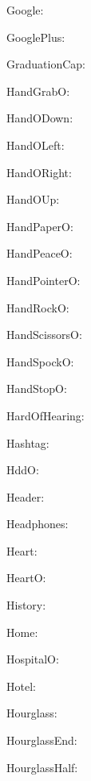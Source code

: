 \documentclass{article}
\begin{document}
      Google: \faGoogle\ 

      GooglePlus: \faGooglePlus\ 

      GraduationCap: \faGraduationCap\ 

      HandGrabO: \faHandGrabO\ 

      HandODown: \faHandODown\ 

      HandOLeft: \faHandOLeft\ 

      HandORight: \faHandORight\ 

      HandOUp: \faHandOUp\ 

      HandPaperO: \faHandPaperO\ 

      HandPeaceO: \faHandPeaceO\ 

      HandPointerO: \faHandPointerO\ 

      HandRockO: \faHandRockO\ 

      HandScissorsO: \faHandScissorsO\ 

      HandSpockO: \faHandSpockO\ 

      HandStopO: \faHandStopO\ 

      HardOfHearing: \faHardOfHearing\ 

      Hashtag: \faHashtag\ 

      HddO: \faHddO\ 

      Header: \faHeader\ 

      Headphones: \faHeadphones\ 

      Heart: \faHeart\ 

      HeartO: \faHeartO\ 

      History: \faHistory\ 

      Home: \faHome\ 

      HospitalO: \faHospitalO\ 

      Hotel: \faHotel\ 

      Hourglass: \faHourglass\ 

      HourglassEnd: \faHourglassEnd\ 

      HourglassHalf: \faHourglassHalf\ 
\end{document}

